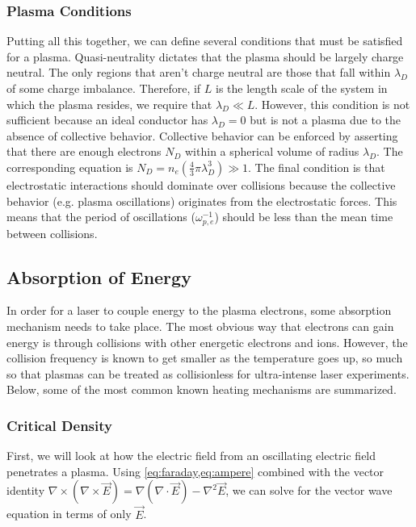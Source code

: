 \subsubsection{Plasma Conditions}
Putting all this together, we can define several conditions that must be satisfied for a plasma\cite{Chen_2015_Plasma}. Quasi-neutrality dictates that the plasma should be largely charge neutral. The only regions that aren't charge neutral are those that fall within $\lambda_D$ of some charge imbalance. Therefore, if $L$ is the length scale of the system in which the plasma resides, we require that $\lambda_D \ll L$. However, this condition is not sufficient because an ideal conductor has $\lambda_D = 0$ but is not a plasma due to the absence of collective behavior. Collective behavior can be enforced by asserting that there are enough electrons $N_D$ within a spherical volume of radius $\lambda_D$. The corresponding equation is $N_D = n_e (\frac{4}{3} \pi \lambda_D^3) \gg 1$. The final condition is that electrostatic interactions should dominate over collisions because the collective behavior (e.g. plasma oscillations) originates from the electrostatic forces. This means that the period of oscillations ($\omega_{p,e}^{-1}$) should be less than the mean time between collisions. 

\subsection{Absorption of Energy} \label{sec:absorption}

In order for a laser to couple energy to the plasma electrons, some absorption mechanism needs to take place. The most obvious way that electrons can gain energy is through collisions with other energetic electrons and ions. However, the collision frequency is known to get smaller as the temperature goes up\cite{Gibbon_2005_Plasma}, so much so that plasmas can be treated as collisionless for ultra-intense laser experiments. Below, some of the most common known heating mechanisms are summarized.

\subsubsection{Critical Density}
First, we will look at how the electric field from an oscillating electric field penetrates a plasma. Using \cref{eq:faraday,eq:ampere} combined with the vector identity $\nabla \times (\nabla \times \vec{E}) = \nabla(\nabla \cdot \vec{E}) - \nabla^2 \vec{E}$\cite{Zangwill_2012}, we can solve for the vector wave equation in terms of only $\vec{E}$. 


